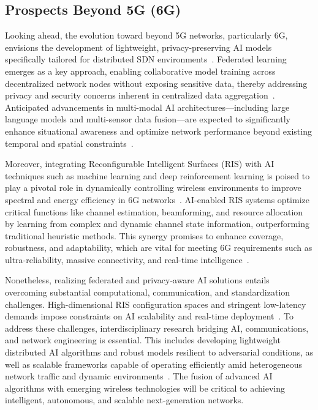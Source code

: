\documentclass[sigconf]{acmart}
\begin{document}
\subsection{Prospects Beyond 5G (6G)}

Looking ahead, the evolution toward beyond 5G networks, particularly 6G, envisions the development of lightweight, privacy-preserving AI models specifically tailored for distributed SDN environments~\cite{ref49,ref50}. Federated learning emerges as a key approach, enabling collaborative model training across decentralized network nodes without exposing sensitive data, thereby addressing privacy and security concerns inherent in centralized data aggregation~\cite{ref52}. Anticipated advancements in multi-modal AI architectures—including large language models and multi-sensor data fusion—are expected to significantly enhance situational awareness and optimize network performance beyond existing temporal and spatial constraints~\cite{ref52}.

Moreover, integrating Reconfigurable Intelligent Surfaces (RIS) with AI techniques such as machine learning and deep reinforcement learning is poised to play a pivotal role in dynamically controlling wireless environments to improve spectral and energy efficiency in 6G networks~\cite{ref49}. AI-enabled RIS systems optimize critical functions like channel estimation, beamforming, and resource allocation by learning from complex and dynamic channel state information, outperforming traditional heuristic methods. This synergy promises to enhance coverage, robustness, and adaptability, which are vital for meeting 6G requirements such as ultra-reliability, massive connectivity, and real-time intelligence~\cite{ref49}.

Nonetheless, realizing federated and privacy-aware AI solutions entails overcoming substantial computational, communication, and standardization challenges. High-dimensional RIS configuration spaces and stringent low-latency demands impose constraints on AI scalability and real-time deployment~\cite{ref49,ref50}. To address these challenges, interdisciplinary research bridging AI, communications, and network engineering is essential. This includes developing lightweight distributed AI algorithms and robust models resilient to adversarial conditions, as well as scalable frameworks capable of operating efficiently amid heterogeneous network traffic and dynamic environments~\cite{ref49,ref50,ref52}. The fusion of advanced AI algorithms with emerging wireless technologies will be critical to achieving intelligent, autonomous, and scalable next-generation networks.
\end{document}
